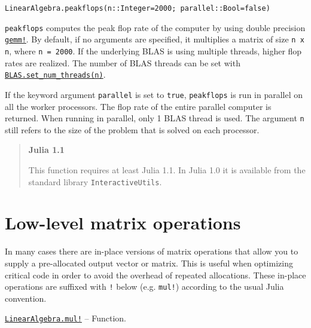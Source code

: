 \begin{adjustwidth}{2em}{0pt}


\begin{verbatim}
LinearAlgebra.peakflops(n::Integer=2000; parallel::Bool=false)
\end{verbatim}

\texttt{peakflops} computes the peak flop rate of the computer by using double precision \hyperlink{8173170876588438683}{\texttt{gemm!}}. By default, if no arguments are specified, it multiplies a matrix of size \texttt{n x n}, where \texttt{n = 2000}. If the underlying BLAS is using multiple threads, higher flop rates are realized. The number of BLAS threads can be set with \hyperlink{2145233402822007277}{\texttt{BLAS.set\_num\_threads(n)}}.

If the keyword argument \texttt{parallel} is set to \texttt{true}, \texttt{peakflops} is run in parallel on all the worker processors. The flop rate of the entire parallel computer is returned. When running in parallel, only 1 BLAS thread is used. The argument \texttt{n} still refers to the size of the problem that is solved on each processor.

\begin{quote}
\textbf{Julia 1.1}

This function requires at least Julia 1.1. In Julia 1.0 it is available from the standard library \texttt{InteractiveUtils}.

\end{quote}


\end{adjustwidth}

\hypertarget{4687212954685590607}{}


\section{Low-level matrix operations}



In many cases there are in-place versions of matrix operations that allow you to supply a pre-allocated output vector or matrix.  This is useful when optimizing critical code in order to avoid the overhead of repeated allocations. These in-place operations are suffixed with \texttt{!} below (e.g. \texttt{mul!}) according to the usual Julia convention.


\hypertarget{364008531309780709}{} 
\hyperlink{364008531309780709}{\texttt{LinearAlgebra.mul!}}  -- {Function.}

